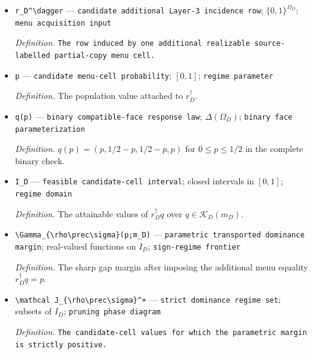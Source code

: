 \documentclass{article}
\begin{document}
\begin{itemize}
  \par\smallskip\noindent\emph{Definition.} A dual weighting of supplied menu equalities certifying a lower bound on \(g_{\rho,\sigma,D}q\).
  \item \texttt{r\_\allowbreak{}D\textasciicircum{}\textbackslash{}\allowbreak{}dagger} --- \texttt{candidate additional Layer-\allowbreak{}3 incidence row}; \(\{0,1\}^{\Omega_D}\); \texttt{menu acquisition input}
  \par\smallskip\noindent\emph{Definition.} \texttt{The row induced by one additional realizable source-\allowbreak{}labelled partial-\allowbreak{}copy menu cell.}
  \item \texttt{p} --- \texttt{candidate menu-\allowbreak{}cell probability}; \([0,1]\); \texttt{regime parameter}
  \par\smallskip\noindent\emph{Definition.} The population value attached to \(r_D^\dagger\).
  \item \texttt{q(p)} --- \texttt{binary compatible-\allowbreak{}face response law}; \(\Delta(\Omega_D)\); \texttt{binary face parameterization}
  \par\smallskip\noindent\emph{Definition.} \(q(p)=(p,1/2-p,1/2-p,p)\) for \(0\le p\le1/2\) in the complete binary check.
  \item \texttt{I\_\allowbreak{}D} --- \texttt{feasible candidate-\allowbreak{}cell interval}; closed intervals in \([0,1]\); \texttt{regime domain}
  \par\smallskip\noindent\emph{Definition.} The attainable values of \(r_D^\dagger q\) over \(q\in\mathcal K_D(m_D)\).
  \item \texttt{\textbackslash{}\allowbreak{}Gamma\_\allowbreak{}\{\textbackslash{}\allowbreak{}rho\textbackslash{}\allowbreak{}prec\textbackslash{}\allowbreak{}sigma\}\allowbreak{}(p;\allowbreak{}m\_\allowbreak{}D)} --- \texttt{parametric transported dominance margin}; real-valued functions on \(I_D\); \texttt{sign-\allowbreak{}regime frontier}
  \par\smallskip\noindent\emph{Definition.} The sharp gap margin after imposing the additional menu equality \(r_D^\dagger q=p\).
  \item \texttt{\textbackslash{}\allowbreak{}mathcal J\_\allowbreak{}\{\textbackslash{}\allowbreak{}rho\textbackslash{}\allowbreak{}prec\textbackslash{}\allowbreak{}sigma\}\allowbreak{}\textasciicircum{}+\allowbreak{}} --- \texttt{strict dominance regime set}; subsets of \(I_D\); \texttt{pruning phase diagram}
  \par\smallskip\noindent\emph{Definition.} \texttt{The candidate-\allowbreak{}cell values for which the parametric margin is strictly positive.}

\end{itemize}
\end{document}
